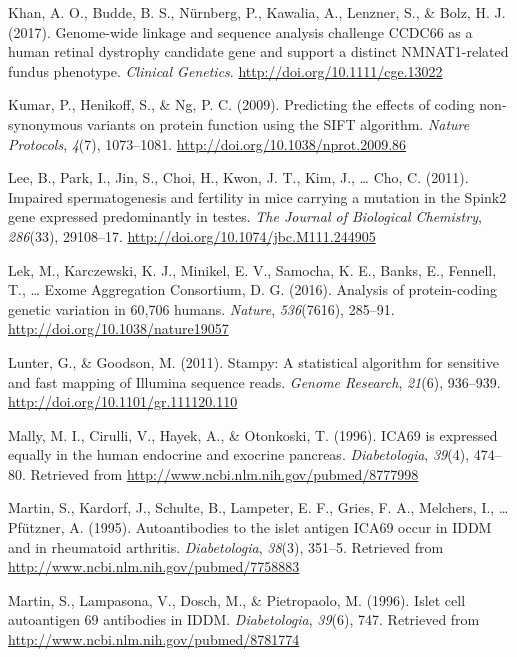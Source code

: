\documentclass[12pt,twoside]{reedthesis}
\theoremstyle{definition}
\theoremstyle{definition}
\theoremstyle{remark}
\begin{document}
  \hypertarget{ref-Khan2017}{}
  Khan, A. O., Budde, B. S., Nürnberg, P., Kawalia, A., Lenzner, S., \&
  Bolz, H. J. (2017). Genome-wide linkage and sequence analysis challenge
  CCDC66 as a human retinal dystrophy candidate gene and support a
  distinct NMNAT1-related fundus phenotype. \emph{Clinical Genetics}.
  \url{http://doi.org/10.1111/cge.13022}
  
  \hypertarget{ref-Kumar2009}{}
  Kumar, P., Henikoff, S., \& Ng, P. C. (2009). Predicting the effects of
  coding non-synonymous variants on protein function using the SIFT
  algorithm. \emph{Nature Protocols}, \emph{4}(7), 1073--1081.
  \url{http://doi.org/10.1038/nprot.2009.86}
  
  \hypertarget{ref-Lee2011}{}
  Lee, B., Park, I., Jin, S., Choi, H., Kwon, J. T., Kim, J., \ldots{}
  Cho, C. (2011). Impaired spermatogenesis and fertility in mice carrying
  a mutation in the Spink2 gene expressed predominantly in testes.
  \emph{The Journal of Biological Chemistry}, \emph{286}(33), 29108--17.
  \url{http://doi.org/10.1074/jbc.M111.244905}
  
  \hypertarget{ref-Lek2016}{}
  Lek, M., Karczewski, K. J., Minikel, E. V., Samocha, K. E., Banks, E.,
  Fennell, T., \ldots{} Exome Aggregation Consortium, D. G. (2016).
  Analysis of protein-coding genetic variation in 60,706 humans.
  \emph{Nature}, \emph{536}(7616), 285--91.
  \url{http://doi.org/10.1038/nature19057}
  
  \hypertarget{ref-Lunter2011}{}
  Lunter, G., \& Goodson, M. (2011). Stampy: A statistical algorithm for
  sensitive and fast mapping of Illumina sequence reads. \emph{Genome
  Research}, \emph{21}(6), 936--939.
  \url{http://doi.org/10.1101/gr.111120.110}
  
  \hypertarget{ref-Mally1996}{}
  Mally, M. I., Cirulli, V., Hayek, A., \& Otonkoski, T. (1996). ICA69 is
  expressed equally in the human endocrine and exocrine pancreas.
  \emph{Diabetologia}, \emph{39}(4), 474--80. Retrieved from
  \url{http://www.ncbi.nlm.nih.gov/pubmed/8777998}
  
  \hypertarget{ref-Martin1995}{}
  Martin, S., Kardorf, J., Schulte, B., Lampeter, E. F., Gries, F. A.,
  Melchers, I., \ldots{} Pfützner, A. (1995). Autoantibodies to the islet
  antigen ICA69 occur in IDDM and in rheumatoid arthritis.
  \emph{Diabetologia}, \emph{38}(3), 351--5. Retrieved from
  \url{http://www.ncbi.nlm.nih.gov/pubmed/7758883}
  
  \hypertarget{ref-Martin1996}{}
  Martin, S., Lampasona, V., Dosch, M., \& Pietropaolo, M. (1996). Islet
  cell autoantigen 69 antibodies in IDDM. \emph{Diabetologia},
  \emph{39}(6), 747. Retrieved from
  \url{http://www.ncbi.nlm.nih.gov/pubmed/8781774}
  
\end{document}
